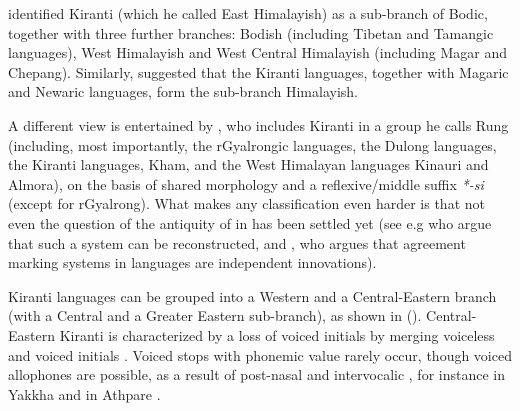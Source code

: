 \citet{Shafer1974_Introduction} identified Kiranti (which he called East Himalayish) as a sub-branch of Bodic, together with three further branches: Bodish (including Tibetan and Tamangic languages), West Himalayish and West Central Himalayish (including Magar and Chepang). Similarly, \citet{Bradley1997_Tibeto-Burman} suggested that the Kiranti languages, together with Magaric and Newaric languages, form the sub-branch Himalayish. 

A different view is entertained by \citet{LaPolla2003_Overview},  who includes Kiranti in a group he calls Rung (including, most importantly, the rGyalrongic languages, the Dulong languages, the Kiranti languages,  Kham, and the West Himalayan languages Kinauri and Almora), on the basis of shared  morphology and a reflexive/middle suffix \emph{*-si} (except for rGyalrong).  What makes any classification even harder is that not even the question of the antiquity of  in  has been settled yet (see e.g \citet{DeLancey2010_Towards, Jacques2012_Agreement} who argue that such a system can be reconstructed, and \citet{LaPolla2001_Role, LaPolla2012_Comments}, who argues that agreement marking systems in  languages are independent innovations).

Kiranti languages can be grouped into a Western and a Central-Eastern branch (with a Central and a Greater Eastern sub-branch), as shown in  (\citealt{Bickeletal_Firstperson}). Central-Eastern Kiranti is characterized by a loss of voiced initials by merging voiceless and voiced initials \citep{Michailovsky1994Manner}. Voiced stops with phonemic value rarely occur, though voiced allophones are possible, as a result of post-nasal and intervocalic , for instance in Yakkha and in Athpare \citep[505]{Ebert2003Kiranti}. 


